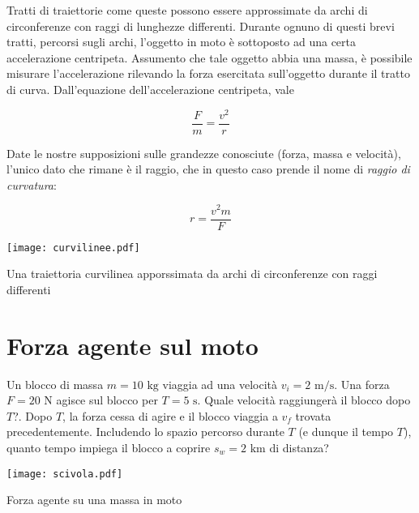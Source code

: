 Tratti di traiettorie come queste possono essere approssimate da archi di
circonferenze con raggi di lunghezze differenti. Durante ognuno di questi brevi
tratti, percorsi sugli archi, l'oggetto in moto è sottoposto ad una certa
accelerazione centripeta. Assumento che tale oggetto abbia una massa, è
possibile misurare l'accelerazione rilevando la forza esercitata sull'oggetto
durante il tratto di curva. Dall'equazione dell'accelerazione centripeta,
vale

\[\frac{F}{m} = \frac{v^2}{r}\]

\noindent Date le nostre supposizioni sulle grandezze conosciute (forza, massa e velocità), l'unico
dato che rimane è il raggio, che in questo caso prende il nome di
\textit{raggio di curvatura}:

\[ r = \frac{v^2m}{F} \]

\begin{marginfigure}
    \centering
    \texttt{[image: curvilinee.pdf]}
    \caption{Una traiettoria curvilinea apporssimata da archi di circonferenze con raggi differenti}
    \label{curvilinee}
\end{marginfigure}































\newpage
\section*{Forza agente sul moto}
Un blocco di massa $m = 10 \text{ kg}$ viaggia ad una velocità $v_i =
2 \text{ m/s}$. Una forza $F = 20 \text{ N}$ agisce sul blocco per
$T = 5 \text{ s}$. Quale velocità raggiungerà il blocco dopo $T$?.
Dopo $T$, la forza cessa di agire e il blocco viaggia a $v_f$ trovata
precedentemente. Includendo lo spazio percorso durante $T$ (e dunque il
tempo $T$), quanto tempo impiega il blocco a coprire $s_w = 2\text{ km}$
di distanza?

\begin{marginfigure}
    \centering
    \texttt{[image: scivola.pdf]}
    \caption{Forza agente su una massa in moto}
\end{marginfigure}

